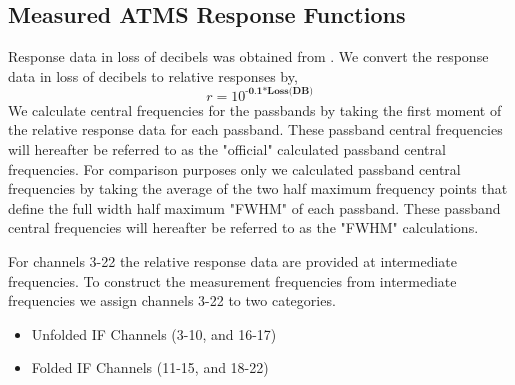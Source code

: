\subsection{Measured ATMS Response Functions}
Response data in loss of decibels was obtained from \cite{Muth_etal_2004}. We convert the response data in loss of decibels to relative responses by, 
\begin{equation}
  r=10^{\textbf{-0.1*Loss(DB)}}    
\end{equation}
We calculate central frequencies for the passbands by taking the first moment of the relative response data for each passband. These passband central frequencies will hereafter be referred to as the "official" calculated passband central frequencies. For comparison purposes only we calculated passband central frequencies by taking the average of the two half maximum frequency points that define the full width half maximum "FWHM" of each passband. These passband central frequencies will hereafter be referred to as the "FWHM" calculations. 


 
For channels 3-22 the relative response data are provided at intermediate frequencies. 
To construct the measurement frequencies from intermediate frequencies we assign channels 3-22 to two categories. 

\begin{itemize}
  \item{Unfolded IF Channels (3-10, and 16-17)}
  \item{Folded IF Channels (11-15, and 18-22)}  
\end{itemize}

